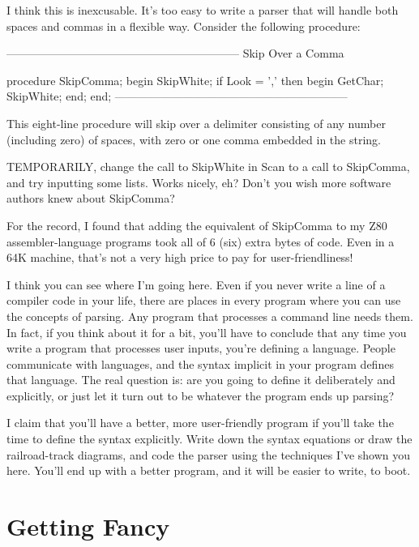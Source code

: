 \documentclass[float=false, crop=false]{standalone}
\begin{document}
I think this is inexcusable. It's too easy to write a parser that will handle
both spaces and commas in a flexible way. Consider the following procedure:

\begin{code}
{--------------------------------------------------------------}
{ Skip Over a Comma }

procedure SkipComma;
begin
   SkipWhite;
   if Look = ',' then begin
      GetChar;
      SkipWhite;
   end;
end;
{--------------------------------------------------------------}
\end{code}

This eight-line procedure will skip over a delimiter consisting of any number
(including zero) of spaces, with zero or one comma embedded in the string.

TEMPORARILY, change the call to SkipWhite in Scan to a call to SkipComma, and
try inputting some lists. Works nicely, eh? Don't you wish more software authors
knew about SkipComma?

For the record, I found that adding the equivalent of SkipComma to my Z80
assembler-language programs took all of 6 (six) extra bytes of code. Even in a
64K machine, that's not a very high price to pay for user-friendliness!

I think you can see where I'm going here. Even if you never write a line of a
compiler code in your life, there are places in every program where you can use
the concepts of parsing. Any program that processes a command line needs them.
In fact, if you think about it for a bit, you'll have to conclude that any time
you write a program that processes user inputs, you're defining a language.
People communicate with languages, and the syntax implicit in your program
defines that language. The real question is: are you going to define it
deliberately and explicitly, or just let it turn out to be whatever the program
ends up parsing?

I claim that you'll have a better, more user-friendly program if you'll take the
time to define the syntax explicitly. Write down the syntax equations or draw
the railroad-track diagrams, and code the parser using the techniques I've shown
you here. You'll end up with a better program, and it will be easier to write,
to boot.


\section{Getting Fancy}
\end{document}
